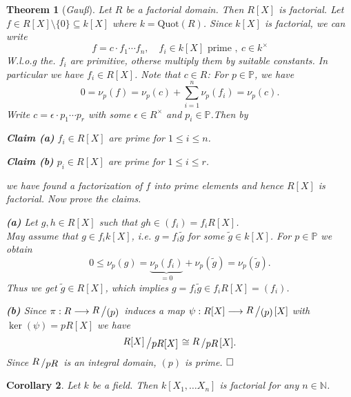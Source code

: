 \documentclass[11pt]{book}
\newtheorem{theorem}{Theorem}[section]
\newtheorem{corollary}[theorem]{Corollary}
\theoremstyle{nonumberbreak}
\newenvironment{pr}[1][]{\ifthenelse{\equal{#1}{}}{\proof}{\proof[#1]}\rm}{\endproof}
\newcommand{\slant}[2]{{\raisebox{.1em}{$#1$}\left/\raisebox{-.1em}{$#2$}\right.}}
\begin{document}
\begin{spacing}{1.3}
\begin{theorem}[\rm \it Gauß]
Let $R$ be a factorial domain. Then $R[X]$ is factorial.
\begin{pr}
Let $f \in R[X]\setminus \{0\} \subseteq k[X]$ where $k=\textrm{Quot}(R)$.
Since $k[X]$ is factorial, we can write
$$f=c \cdot f_1 \cdots f_n, \quad f_i \in k[X] \textrm{ prime }, \ c \in k^{\times}$$
W.l.o.g the. $f_i$ are primitive, otherse multiply them by suitable constants. In particular we have $f_i \in R[X]$.
Note that $c \in R$: For $p \in \mathbb{P}$, we have $$0=\nu_p(f)=\nu_p(c)+ \sum_{i=1}^n \nu_p(f_i)=\nu_p(c).$$
Write $c= \epsilon \cdot p_1 \cdots p_r$ with some $\epsilon \in R^{\times}$ and $p_i \in \mathbb{P}$.Then by
\begin{compactenum}
\item[\textbf{Claim (a)}] $f_i \in R[X]$ are prime for $1 \leqslant i \leqslant n$.
\item[\textbf{Claim (b)}] $p_i \in R[X]$ are prime for $1 \leqslant i \leqslant r$.
\end{compactenum}
we have found a factorization of $f$ into prime elements and hence $R[X]$ is factorial. Now prove the claims.
\begin{compactenum}
\item[\textbf{(a)}] Let $g,h \in R[X]$ such that $gh \in ( f_i )=f_i R[X]$.\\
May assume that $g \in f_ik[X]$, i.e. $g=f_i \tilde{g}$ for some $\tilde{g} \in k[X]$. For $p \in \mathbb{P}$ we obtain
$$0 \leqslant \nu_p(g)=\underbrace{\nu_p(f_i)}_{=0}+\nu_p(\tilde{g})=\nu_p(\tilde{g}).$$
Thus we get $\tilde{g} \in R[X]$, which implies $g=f_i \tilde{g} \in f_i R[X]=( f_i )$.
\item[\textbf{(b)}] Since $\pi:R \longrightarrow \slant{R}{( p )}$ induces a map $\psi: R[X] \longrightarrow \slant{R}{( p )}[X]$ with $\ker(\psi)=pR[X]$ we have
$$\slant{R[X]}{p R[X]} \cong \slant{R}{pR}[X].$$
Since $\slant{R}{pR}$ is an integral domain, $( p )$ is prime. $\hfill \Box$
\end{compactenum}
\end{pr}
\end{theorem}

\begin{corollary} %
Let $k$ be a field. Then $k[X_1, \ldots X_n]$ is factorial for any $n \in \mathbb{N}$.
\end{corollary}



\end{spacing}
\end{document}
